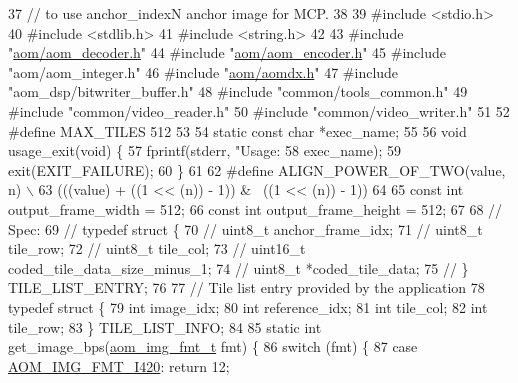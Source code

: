 \begin{DoxyCodeInclude}
37 \textcolor{comment}{// to use anchor\_indexN anchor image for MCP.}
38 
39 \textcolor{preprocessor}{#include <stdio.h>}
40 \textcolor{preprocessor}{#include <stdlib.h>}
41 \textcolor{preprocessor}{#include <string.h>}
42 
43 \textcolor{preprocessor}{#include "\hyperlink{aom__decoder_8h}{aom/aom\_decoder.h}"}
44 \textcolor{preprocessor}{#include "\hyperlink{aom__encoder_8h}{aom/aom\_encoder.h}"}
45 \textcolor{preprocessor}{#include "aom/aom\_integer.h"}
46 \textcolor{preprocessor}{#include "\hyperlink{aomdx_8h}{aom/aomdx.h}"}
47 \textcolor{preprocessor}{#include "aom\_dsp/bitwriter\_buffer.h"}
48 \textcolor{preprocessor}{#include "common/tools\_common.h"}
49 \textcolor{preprocessor}{#include "common/video\_reader.h"}
50 \textcolor{preprocessor}{#include "common/video\_writer.h"}
51 
52 \textcolor{preprocessor}{#define MAX\_TILES 512}
53 
54 \textcolor{keyword}{static} \textcolor{keyword}{const} \textcolor{keywordtype}{char} *exec\_name;
55 
56 \textcolor{keywordtype}{void} usage\_exit(\textcolor{keywordtype}{void}) \{
57   fprintf(stderr, \textcolor{stringliteral}{"Usage: %
58           exec\_name);
59   exit(EXIT\_FAILURE);
60 \}
61 
62 \textcolor{preprocessor}{#define ALIGN\_POWER\_OF\_TWO(value, n) \(\backslash\)}
63 \textcolor{preprocessor}{  (((value) + ((1 << (n)) - 1)) & ~((1 << (n)) - 1))}
64 
65 \textcolor{keyword}{const} \textcolor{keywordtype}{int} output\_frame\_width = 512;
66 \textcolor{keyword}{const} \textcolor{keywordtype}{int} output\_frame\_height = 512;
67 
68 \textcolor{comment}{// Spec:}
69 \textcolor{comment}{// typedef struct \{}
70 \textcolor{comment}{//   uint8\_t anchor\_frame\_idx;}
71 \textcolor{comment}{//   uint8\_t tile\_row;}
72 \textcolor{comment}{//   uint8\_t tile\_col;}
73 \textcolor{comment}{//   uint16\_t coded\_tile\_data\_size\_minus\_1;}
74 \textcolor{comment}{//   uint8\_t *coded\_tile\_data;}
75 \textcolor{comment}{// \} TILE\_LIST\_ENTRY;}
76 
77 \textcolor{comment}{// Tile list entry provided by the application}
78 \textcolor{keyword}{typedef} \textcolor{keyword}{struct }\{
79   \textcolor{keywordtype}{int} image\_idx;
80   \textcolor{keywordtype}{int} reference\_idx;
81   \textcolor{keywordtype}{int} tile\_col;
82   \textcolor{keywordtype}{int} tile\_row;
83 \} TILE\_LIST\_INFO;
84 
85 \textcolor{keyword}{static} \textcolor{keywordtype}{int} get\_image\_bps(\hyperlink{aom__image_8h_ab71efff8c7f49380fad23b93bc2e9bfc}{aom\_img\_fmt\_t} fmt) \{
86   \textcolor{keywordflow}{switch} (fmt) \{
87     \textcolor{keywordflow}{case} \hyperlink{aom__image_8h_a930317c04b4bd0a660bb5e744055523cabd778a3d697463e89d12a1117f417b60}{AOM\_IMG\_FMT\_I420}: \textcolor{keywordflow}{return} 12;
}
\end{DoxyCodeInclude}
